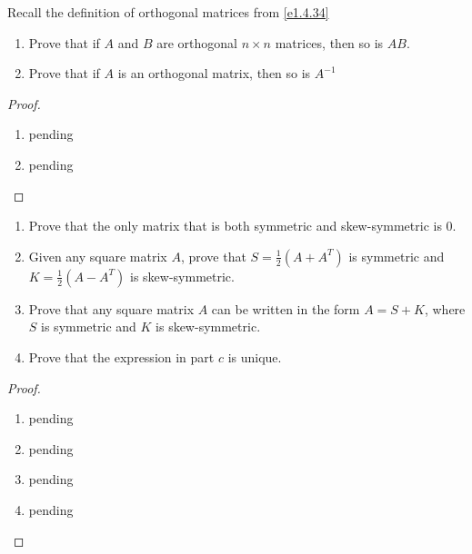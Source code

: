 \begin{exercise} \label{e1.4.35}
    Recall the definition of orthogonal matrices from \ref{e1.4.34}
    
    \begin{enumerate}
        \item Prove that if \( A \) and \( B \) are orthogonal \( n \times n \) matrices, then so is \( AB \).
        
        \item Prove that if \( A \) is an orthogonal matrix, then so is \( A^{-1} \)
    \end{enumerate}
    
    \begin{proof}
        \begin{enumerate}
            \item pending
            
            \item pending
        \end{enumerate}
    \end{proof}
\end{exercise} %

\begin{exercise} \label{e1.4.36}
    \begin{enumerate}
        \item Prove that the only matrix that is both symmetric and skew-symmetric is \( 0 \).
        
        \item Given any square matrix \( A \), prove that \( S = \frac{1}{2}(A+A^T) \) is symmetric and \( K = \frac{1}{2}(A-A^T) \) is skew-symmetric.
        
        \item Prove that any square matrix \( A \) can be written in the form \( A = S + K \), where \( S \) is symmetric and \( K \) is skew-symmetric.
        
        \item Prove that the expression in part \( c \) is unique.
    \end{enumerate}
    
    \begin{proof}
        \begin{enumerate}
            \item pending
            
            \item pending
            
            \item pending
            
            \item pending
        \end{enumerate}
    \end{proof}
\end{exercise} %

